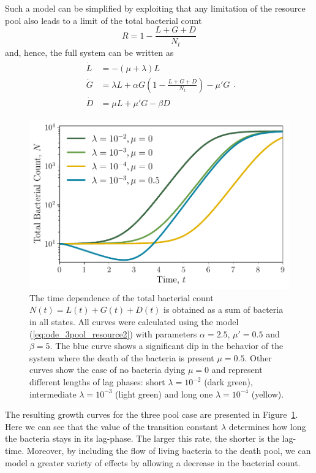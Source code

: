 \documentclass[10pt,A4paper]{article}
\numberwithin{equation}{section}
\begin{document}
%
Such a model can be simplified by exploiting that any limitation of the resource pool also leads to a limit of the total bacterial count
\begin{equation}
    R = 1 - \frac{L+G+D}{N_t}
\end{equation}
and, hence, the full system can be written as
\begin{align}
    \begin{split}
        \dot{L} &= -(\mu + \lambda) L\\
        \dot{G} &= \lambda L + \alpha G\left(1-\frac{L+G+D}{N_t}\right)-\mu' G\\
        \dot{D} &= \mu  L + \mu' G- \beta D 
    \end{split}.
\label{eq:ode_3pool_resource2}
\end{align}
%
%
\begin{figure}
    \begin{center}
    \includegraphics[width=0.9\columnwidth]{Figures/pool_model_3pools_resource.pdf}
    \caption{
        The time dependence of the total bacterial count $N(t) = L(t) + G(t) + D(t)$ is obtained as a sum of bacteria in all states.
        All curves were calculated using the model (\ref{eq:ode_3pool_resource2}) with parameters $\alpha=2.5$, $\mu'=0.5$ and $\beta=5$.
        The blue curve shows a significant dip in the behavior of the system where the death of the bacteria is present $\mu = 0.5$.
        Other curves show the case of no bacteria dying $\mu=0$ and represent different lengths of lag phases: short $\lambda=10^{-2}$ (dark green), intermediate $\lambda=10^{-3}$ (light green) and long one $\lambda=10^{-4}$ (yellow).
    }
    \label{fig:3pool_resource_plots}
    \end{center}
\end{figure}
The resulting growth curves for the three pool case are presented in Figure~\ref{fig:3pool_resource_plots}.
Here we can see that the value of the transition constant $\lambda$ determines how long the bacteria stays in its lag-phase.
The larger this rate, the shorter is the lag-time.
Moreover, by including the flow of living bacteria to the death pool, we can model a greater variety of effects by allowing a decrease in the bacterial count.
%
%
\end{document}
